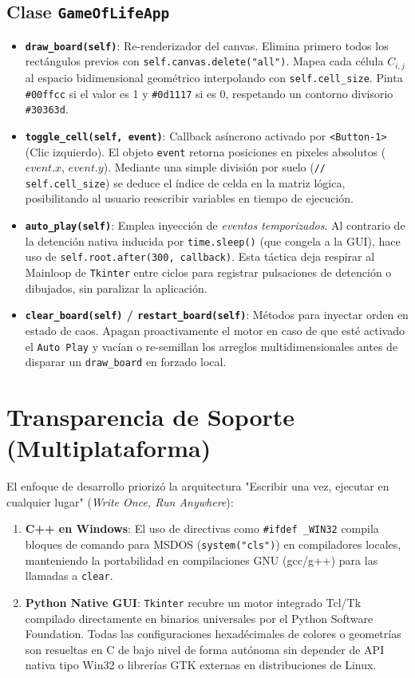 \documentclass[12pt,a4paper]{article}
\begin{document}
\subsection{Clase \texttt{GameOfLifeApp}}
\begin{itemize}
    \item \textbf{\texttt{draw\_board(self)}}: Re-renderizador del canvas. Elimina primero todos los rectángulos previos con \texttt{self.canvas.delete("all")}. Mapea cada célula $C_{i,j}$ al espacio bidimensional geométrico interpolando con \texttt{self.cell\_size}. Pinta \texttt{\#00ffcc} si el valor es 1 y \texttt{\#0d1117} si es 0, respetando un contorno divisorio \texttt{\#30363d}.
    \item \textbf{\texttt{toggle\_cell(self, event)}}: Callback asíncrono activado por \texttt{\textless Button-1\textgreater} (Clic izquierdo). El objeto \texttt{event} retorna posiciones en pixeles absolutos ($event.x$, $event.y$). Mediante una simple división por suelo (\texttt{// self.cell\_size}) se deduce el índice de celda en la matriz lógica, posibilitando al usuario reescribir variables en tiempo de ejecución.
    \item \textbf{\texttt{auto\_play(self)}}: Emplea inyección de \textit{eventos temporizados}. Al contrario de la detención nativa inducida por \texttt{time.sleep()} (que congela a la GUI), hace uso de \texttt{self.root.after(300, callback)}. Esta táctica deja respirar al Mainloop de \texttt{Tkinter} entre ciclos para registrar pulsaciones de detención o dibujados, sin paralizar la aplicación.
    \item \textbf{\texttt{clear\_board(self)} / \texttt{restart\_board(self)}}: Métodos para inyectar orden en estado de caos. Apagan proactivamente el motor en caso de que esté activado el \texttt{Auto Play} y vacían o re-semillan los arreglos multidimensionales antes de disparar un \texttt{draw\_board} en forzado local.
\end{itemize}

\section{Transparencia de Soporte (Multiplataforma)}
El enfoque de desarrollo priorizó la arquitectura "Escribir una vez, ejecutar en cualquier lugar" (\textit{Write Once, Run Anywhere}):
\begin{enumerate}
    \item \textbf{C++ en Windows}: El uso de directivas como \texttt{\#ifdef \_WIN32} compila bloques de comando para MSDOS (\texttt{system("cls")}) en compiladores locales, manteniendo la portabilidad en compilaciones GNU (gcc/g++) para las llamadas a \texttt{clear}.
    \item \textbf{Python Native GUI}: \texttt{Tkinter} recubre un motor integrado Tcl/Tk compilado directamente en binarios universales por el Python Software Foundation. Todas las configuraciones hexadécimales de colores o geometrías son resueltas en C de bajo nivel de forma autónoma sin depender de API nativa tipo Win32 o librerías GTK externas en distribuciones de Linux.
\end{enumerate}
\end{document}
